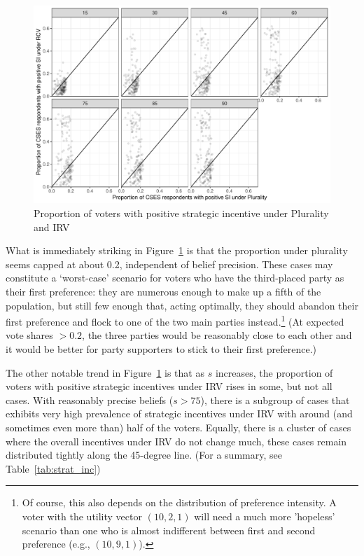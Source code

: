 \documentclass[11pt, letter]{article}
\begin{document}
\begin{figure}[!h]
	\centering
	\includegraphics[width = .8 \textwidth]{"../output/figures/cses_prop"}
	\caption{Proportion of voters with positive strategic incentive under Plurality and IRV}
	\label{fig:sv_dist}
\end{figure}

What is immediately striking in Figure~\ref{fig:sv_dist} is that the proportion under plurality seems capped at about 0.2, independent of belief precision. These cases may constitute a `worst-case' scenario for voters who have the third-placed party as their first preference: they are numerous enough to make up a fifth of the population, but still few enough that, acting optimally, they should abandon their first preference and flock to one of the two main parties instead.\footnote{Of course, this also depends on the distribution of preference intensity. A voter with the utility vector $(10, 2, 1)$ will need a much more 'hopeless' scenario than one who is almost indifferent between first and second preference (e.g., $(10, 9, 1)$).} (At expected vote shares $> 0.2$, the three parties would be reasonably close to each other and it would be better for party supporters to stick to their first preference.)

The other notable trend in Figure~\ref{fig:sv_dist} is that as $s$ increases, the proportion of voters with positive strategic incentives under IRV rises in some, but not all cases. With reasonably precise beliefs ($s > 75$), there is a subgroup of cases that exhibits very high prevalence of strategic incentives under IRV with around (and sometimes even more than) half of the voters. Equally, there is a cluster of cases where the overall incentives under IRV do not change much, these cases remain distributed tightly along the 45-degree line. (For a summary, see Table~\ref{tab:strat_inc})
\end{document}
